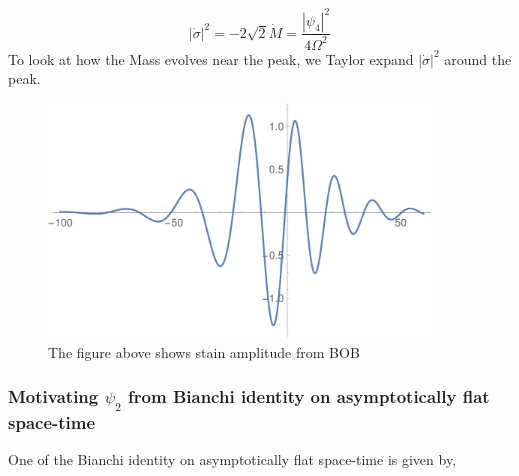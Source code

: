 \documentclass[prd,preprintnumbers,onecolumn,eqsecnum,floatfix,letter]{revtex4}
\begin{document}
\begin{equation}
	|\dot{\sigma}|^2 = -2\sqrt{2}\dot{M} = \frac{|\psi_4|^2}{4\Omega^2}
\end{equation}
To look at how the Mass evolves near the peak, we Taylor expand $|\dot{\sigma}|^2$ around the peak.
\begin{figure}
	\includegraphics[width=4.0in]{../plots/SigmaSqr.pdf}
	\caption{The figure above shows stain amplitude from BOB}
	\label{fig:SigmaSqr}
\end{figure} 
\subsubsection{Motivating $\psi_2$ from Bianchi identity on asymptotically flat space-time}
One of the Bianchi identity on asymptotically flat space-time is given by,
\end{document}
